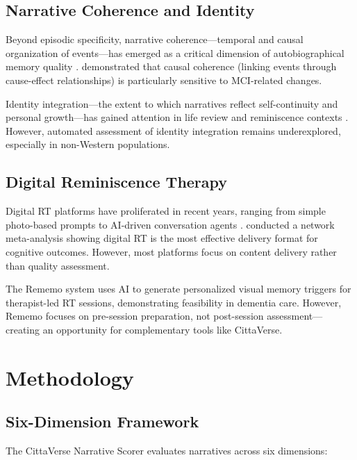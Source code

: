 \documentclass[11pt]{article}
\begin{document}
\subsection{Narrative Coherence and Identity}

Beyond episodic specificity, narrative coherence—temporal and causal organization of events—has emerged as a critical dimension of autobiographical memory quality \cite{habermas2019}. \citet{wang2020} demonstrated that causal coherence (linking events through cause-effect relationships) is particularly sensitive to MCI-related changes.

Identity integration—the extent to which narratives reflect self-continuity and personal growth—has gained attention in life review and reminiscence contexts \cite{habermas2021}. However, automated assessment of identity integration remains underexplored, especially in non-Western populations.

\subsection{Digital Reminiscence Therapy}

Digital RT platforms have proliferated in recent years, ranging from simple photo-based prompts to AI-driven conversation agents \cite{gonzalez2021}. \citet{pu2025} conducted a network meta-analysis showing digital RT is the most effective delivery format for cognitive outcomes. However, most platforms focus on content delivery rather than quality assessment.

The Rememo system \cite{seah2026} uses AI to generate personalized visual memory triggers for therapist-led RT sessions, demonstrating feasibility in dementia care. However, Rememo focuses on pre-session preparation, not post-session assessment—creating an opportunity for complementary tools like CittaVerse.

\section{Methodology}

\subsection{Six-Dimension Framework}

The CittaVerse Narrative Scorer evaluates narratives across six dimensions:
\end{document}

